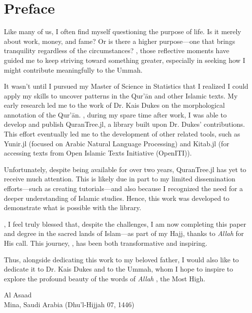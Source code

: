 \chapter*{Preface}
\label{ch:preface}
Like many of us, I often find myself questioning the purpose of life. Is it merely about work, money, and fame? Or is there a higher purpose—one that brings tranquility regardless of the circumstances? , those reflective moments have guided me to keep striving toward something greater, especially in seeking how I might contribute meaningfully to the Ummah.

It wasn't until I pursued my Master of Science in Statistics that I realized I could apply my skills to uncover patterns in the Qur'\=an and other Islamic texts. My early research led me to the work of Dr. Kais Dukes on the morphological annotation of the Qur'\=an. , during my spare time after work, I was able to develop and publish QuranTree.jl, a library built upon Dr. Dukes' contributions. This effort eventually led me to the development of other related tools, such as Yunir.jl (focused on Arabic Natural Language Processing) and Kitab.jl (for accessing texts from Open Islamic Texts Initiative (OpenITI)).

Unfortunately, despite being available for over two years, QuranTree.jl has yet to receive much attention. This is likely due in part to my limited dissemination efforts—such as creating tutorials—and also because I recognized the need for a deeper understanding of Islamic studies. Hence, this work was developed to demonstrate what is possible with the library.

, I feel truly blessed that, despite the challenges, I am now completing this paper and degree in the sacred lands of Islam—as part of my Hajj, thanks to \textit{Allah}  for His call. This journey, , has been both transformative and inspiring.

Thus, alongside dedicating this work to my beloved father, I would also like to dedicate it to Dr. Kais Dukes and to the  Ummah, whom I hope to inspire to explore the profound beauty of the words of \textit{Allah} , the Most High.
\begin{center}
    Al Asaad\\
    Mina, Saudi Arabia (Dhu'l-Hijjah 07, 1446)\\
\end{center}